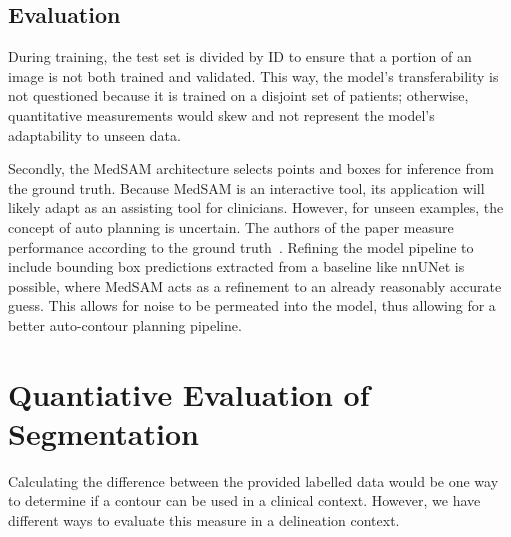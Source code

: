 \documentclass[11pt,twoside]{report}
\begin{document}


\subsection{Evaluation}

During training, the test set is divided by ID to ensure that a portion of an image is not both trained and validated. This way, the model's transferability is not questioned because it is trained on a disjoint set of patients; otherwise, quantitative measurements would skew and not represent the model's adaptability to unseen data.

Secondly, the MedSAM architecture selects points and boxes for inference from the ground truth. Because MedSAM is an interactive tool, its application will likely adapt as an assisting tool for clinicians. However, for unseen examples, the concept of auto planning is uncertain. The authors of the paper measure performance according to the ground truth~\cite{SAM, Ma2024}. Refining the model pipeline to include bounding box predictions extracted from a baseline like nnUNet is possible, where MedSAM acts as a refinement to an already reasonably accurate guess. This allows for noise to be permeated into the model, thus allowing for a better auto-contour planning pipeline.

\section{Quantiative Evaluation of Segmentation}\label{sect:performance-evaluation}

Calculating the difference between the provided labelled data would be one way to determine if a contour can be used in a clinical context. However, we have different ways to evaluate this measure in a delineation context.
\end{document}
